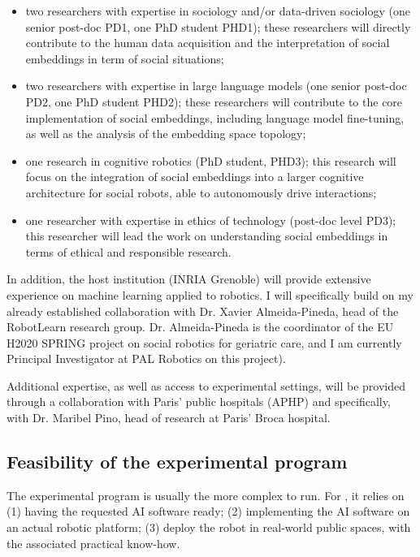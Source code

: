 \begin{itemize}

    \item  two researchers with expertise in sociology and/or data-driven
        sociology (one senior post-doc PD1, one PhD student PHD1); these researchers will
        directly contribute to the human data acquisition and the interpretation
        of social embeddings in term of social situations;

    \item two researchers with expertise in large language models (one senior
        post-doc PD2, one PhD student PHD2); these researchers will contribute to the
        core implementation of social embeddings, including language model
        fine-tuning, as well as the analysis of the embedding space topology;

    \item one research in cognitive robotics (PhD student, PHD3); this research
        will focus on the integration of social embeddings into a larger
        cognitive architecture for social robots, able to autonomously drive
        interactions;

    \item one researcher with expertise in ethics of technology (post-doc
        level PD3); this researcher will lead the work on understanding social
        embeddings in terms of ethical and responsible research.
\end{itemize}

In addition, the host institution (INRIA Grenoble) will provide extensive
experience on machine learning applied to robotics. I will specifically build on
my already established collaboration with Dr. Xavier Almeida-Pineda, head of the
RobotLearn research group. Dr. Almeida-Pineda is the coordinator of the EU H2020
SPRING project on social robotics for geriatric care, and I am currently
Principal Investigator at PAL Robotics on this project).

Additional expertise, as well as access to experimental settings, will be
provided through a collaboration with Paris' public hospitals (APHP) and
specifically, with Dr. Maribel Pino, head of research at Paris' Broca hospital.

\subsection{Feasibility of the experimental program}

The experimental program is usually the more complex to run. For \project, it
relies on (1) having the requested AI software ready; (2) implementing the AI
software on an actual robotic platform; (3) deploy the robot in real-world
public spaces, with the associated practical know-how.

